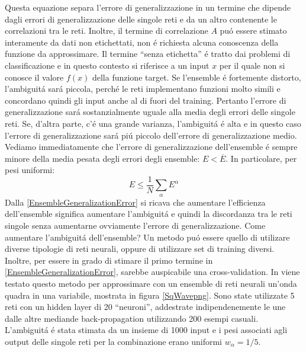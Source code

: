 \documentclass[a4paper,12pt]{report}
\begin{document}
  Questa equazione separa l'errore di generalizzazione in un termine che dipende dagli errori di generalizzazione delle singole reti e da un altro contenente le correlazioni tra le reti. 
  Inoltre, il termine di correlazione $A$ pu\'o essere stimato interamente da dati non etichettati, non \'e richiesta alcuna conoscenza della funzione da approssimare. 
  Il termine ``senza etichetta'' \'e tratto dai problemi di classificazione e in questo contesto si riferisce a un input $x$ per il quale non si conosce il valore $f(x)$ della funzione target. 
  Se l'ensemble \'e fortemente distorto, l'ambiguit\'a sar\'a piccola, perch\'e le reti implementano funzioni molto simili e concordano quindi gli input anche al di fuori del training. 
  Pertanto l'errore di generalizzazione sar\'a sostanzialmente uguale alla media degli errori delle singole reti. 
  Se, d'altra parte, c'\'e una grande varianza, l'ambiguit\'a \'e alta e in questo caso l'errore di generalizzazione sar\'a pi\'u piccolo dell'errore di generalizzazione medio.
  Vediamo immediatamente che l'errore di generalizzazione dell'ensemble \'e sempre minore della media pesata degli errori degli ensemble: $E < \overline{E}$. In particolare, per pesi uniformi:
  \begin{equation}
   E \le \frac{1}{N} \sum_{\alpha} E^{\alpha}
  \end{equation}
  Dalla \ref{EnsembleGeneralizationError} si ricava che aumentare l'efficienza dell'ensemble significa aumentare l'ambiguit\'a e quindi la discordanza tra le reti singole senza aumentarne ovviamente l'errore di generalizzazione. 
  Come aumentare l'ambiguit\'a dell'ensemble? Un metodo pu\'o essere quello di utilizare diverse tipologie di reti neurali, oppure di utilizzare set di training diversi. 
  Inoltre, per essere in grado di stimare il primo termine in \ref{EnsembleGeneralizationError}, sarebbe auspicabile una cross-validation. 
  In \cite{krogh1995neural} viene testato questo metodo per approssimare con un ensemble di reti neurali un'onda quadra in una variabile, mostrata in figura \ref{SqWavepng}. 
  Sono state utilizzate 5 reti con un hidden layer di 20 ``neuroni'', addestrate indipendenemente le une dalle altre mediande back-propagation utilizzando 200 esempi casuali. 
  L'ambiguit\'a \'e stata stimata da un insieme di 1000 input e i pesi associati agli output delle singole reti per la combinazione erano uniformi $w_{\alpha} = 1/5$.
\end{document}
